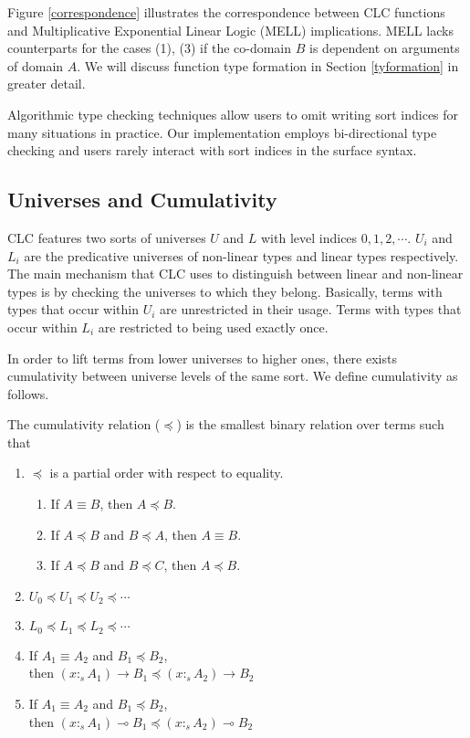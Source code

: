 \documentclass[sigplan,screen,review,anonymous]{acmart}
\newcommand{\stype}[1]{:_#1}
\begin{document}
Figure \ref{correspondence} illustrates the correspondence between CLC functions and Multiplicative Exponential Linear Logic (MELL) implications. MELL lacks counterparts for the cases (1), (3) if the co-domain $B$ is dependent on arguments of domain $A$. We will discuss function type formation in Section \ref{tyformation} in greater detail.

Algorithmic type checking techniques allow users to omit writing sort indices for many situations in practice. Our implementation employs bi-directional type checking and users rarely interact with sort indices in the surface syntax.

\subsection{Universes and Cumulativity}
CLC features two sorts of universes $U$ and $L$ with level indices $0, 1, 2, \cdots$. $U_i$ and $L_i$ are the predicative universes of non-linear types and linear types respectively. The main mechanism that CLC uses to distinguish between linear and non-linear types is by checking the universes to which they belong. Basically, terms with types that occur within $U_i$ are unrestricted in their usage. Terms with types that occur within $L_i$ are restricted to being used exactly once.

In order to lift terms from lower universes to higher ones, there exists cumulativity between universe levels of the same sort. We define cumulativity as follows.

\begin{definition}
  The cumulativity relation ($\preceq$) is the smallest binary relation over terms such that
  \begin{enumerate}
    \item $\preceq$ is a partial order with respect to equality.
          \begin{enumerate}
            \item If $A \equiv B$, then $A \preceq B$.
            \item If $A \preceq B$ and $B \preceq A$, then $A \equiv B$.
            \item If $A \preceq B$ and $B \preceq C$, then $A \preceq B$.
          \end{enumerate}
    \item $U_0 \preceq U_1 \preceq U_2 \preceq \cdots$
    \item $L_0 \preceq L_1 \preceq L_2 \preceq \cdots$
    \item If $A_1 \equiv A_2$ and $B_1 \preceq B_2$, \\ then
          $(x \stype{s} A_1) \rightarrow B_1 \preceq (x \stype{s} A_2) \rightarrow B_2$
    \item If $A_1 \equiv A_2$ and $B_1 \preceq B_2$, \\ then
          $(x \stype{s} A_1) \multimap B_1 \preceq (x \stype{s} A_2) \multimap B_2$
  \end{enumerate}
\end{definition}
\end{document}
